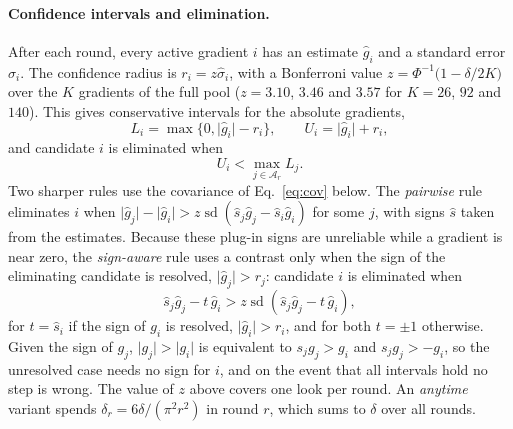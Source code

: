 \documentclass[aps,pra,reprint,superscriptaddress,nofootinbib]{revtex4-2}
\begin{document}
\paragraph{Confidence intervals and elimination.} After each round, every active gradient $i$ has an estimate $\hat g_i$ and a standard error $\hat\sigma_i$. The confidence radius is $r_i=z\hat\sigma_i$, with a Bonferroni value $z=\Phi^{-1}\!\big(1-\delta/2K\big)$ over the $K$ gradients of the full pool ($z=3.10$, $3.46$ and $3.57$ for $K=26$, $92$ and $140$). This gives conservative intervals for the absolute gradients,
\begin{equation}
L_i=\max\{0,\lvert\hat g_i\rvert-r_i\},\qquad U_i=\lvert\hat g_i\rvert+r_i ,
\end{equation}
and candidate $i$ is eliminated when
\begin{equation}
U_i<\max_{j\in\mathcal A_r}L_j .
\label{eq:elim}
\end{equation}
Two sharper rules use the covariance of Eq.~\eqref{eq:cov} below. The \emph{pairwise} rule eliminates $i$ when $\lvert\hat g_j\rvert-\lvert\hat g_i\rvert>z\operatorname{sd}(\hat s_j\hat g_j-\hat s_i\hat g_i)$ for some $j$, with signs $\hat s$ taken from the estimates. Because these plug-in signs are unreliable while a gradient is near zero, the \emph{sign-aware} rule uses a contrast only when the sign of the eliminating candidate is resolved, $\lvert\hat g_j\rvert>r_j$: candidate $i$ is eliminated when
\begin{equation}
\hat s_j\hat g_j-t\,\hat g_i>z\operatorname{sd}(\hat s_j\hat g_j-t\,\hat g_i),
\label{eq:safe}
\end{equation}
for $t=\hat s_i$ if the sign of $g_i$ is resolved, $\lvert\hat g_i\rvert>r_i$, and for both $t=\pm1$ otherwise. Given the sign of $g_j$, $\lvert g_j\rvert>\lvert g_i\rvert$ is equivalent to $s_jg_j>g_i$ and $s_jg_j>-g_i$, so the unresolved case needs no sign for $i$, and on the event that all intervals hold no step is wrong. The value of $z$ above covers one look per round. An \emph{anytime} variant spends $\delta_r=6\delta/(\pi^2r^2)$ in round $r$, which sums to $\delta$ over all rounds.
\end{document}
